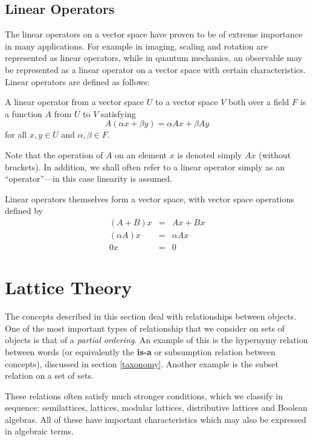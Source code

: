 \subsection{Linear Operators}
\label{operators}

The linear operators on a vector space have proven to be of extreme importance in many applications. For example in imaging, scaling and rotation are represented as linear operators, while in quantum mechanics, an observable may be represented as a linear operator on a vector space with certain characteristics. Linear operators are defined as follows:
\begin{defn}
A linear operator from a vector space $U$ to a vector space $V$ both over a field $F$ is a function $A$ from $U$ to $V$ satisfying
$$A(\alpha x + \beta y) = \alpha Ax + \beta Ay$$
for all $x,y \in U$ and $\alpha, \beta \in F$.
\end{defn}
Note that the operation of $A$ on an element $x$ is denoted simply $Ax$ (without brackets). In addition, we shall often refer to a linear operator simply as an ``operator''---in this case linearity is assumed.

Linear operators themselves form a vector space, with vector space operations defined by
\begin{eqnarray*}
(A + B)x&=&Ax + Bx\\
(\alpha A)x&=&\alpha Ax\\
0x&=&0
\end{eqnarray*}

\section{Lattice Theory}
\label{lattices}

The concepts described in this section deal with relationships between objects. One of the most important types of relationship that we consider on sets of objects is that of a \emph{partial ordering}. An example of this is the hypernymy relation between words (or equivalently the \textbf{is-a} or subsumption relation between concepts), discussed in section \ref{taxonomy}. Another example is the subset relation on a set of sets.

These relations often satisfy much stronger conditions, which we classify in sequence: semilattices, lattices, modular lattices, distributive lattices and Boolean algebras. All of these have important characteristics which may also be expressed in algebraic terms.

